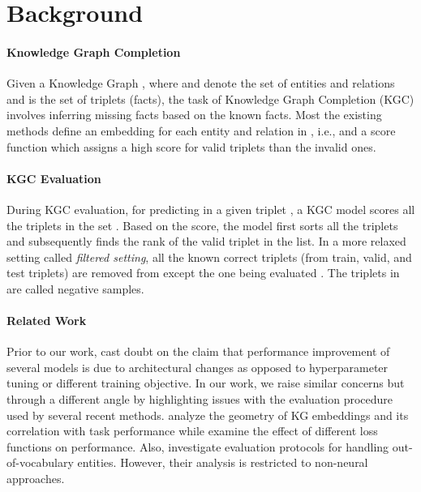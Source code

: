 \documentclass[11pt,a4paper]{article}
\begin{document}
%
 \section{Background}

\paragraph{Knowledge Graph Completion} Given a Knowledge Graph , where  and  denote the set of entities and relations and  is the set of triplets (facts), the task of Knowledge Graph Completion (KGC) involves inferring missing facts based on the known facts. Most the existing methods define an embedding for each entity and relation in , i.e.,  and a score function  which assigns a high score for valid triplets than the invalid ones.


\paragraph{KGC Evaluation} During KGC evaluation, for predicting  in a given triplet , a KGC model scores all the triplets in the set . Based on the score, the model first sorts all the triplets and subsequently finds the rank of the valid triplet  in the list. In a more relaxed setting called \textit{filtered setting}, all the known correct triplets (from train, valid, and test triplets) are removed from  except the one being evaluated \cite{transe}.
The triplets in  are called negative samples.


\paragraph{Related Work}
\label{sec:related_works}

Prior to our work, \citet{baselines_strike_back,mausam_2} cast doubt on the claim that performance improvement of several models is due to architectural changes as opposed to hyperparameter tuning or different training objective. 
In our work, we raise similar concerns but through a different angle by highlighting issues with the evaluation procedure used by several recent methods. \citet{kg_geometry} analyze the geometry of KG embeddings and its correlation with task performance while \citet{effect_of_loss_function} examine the effect of different loss functions on performance. Also, \citet{mausam_1} investigate evaluation protocols for handling out-of-vocabulary entities. However, their analysis is restricted to non-neural approaches.
\end{document}
